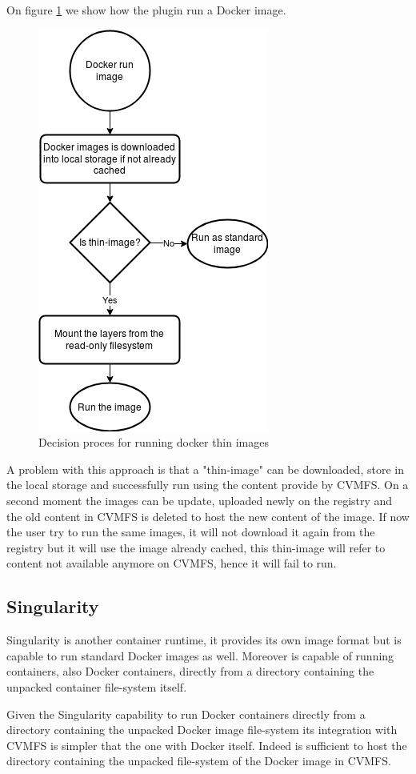 On figure \ref{fig:flowchart-run-thin-image} we show how the plugin run a Docker image. 

\begin{figure}
\includegraphics{gfx/RunThinImages}
\caption{Decision proces for running docker thin images}
\label{fig:flowchart-run-thin-image}
\end{figure}

A problem with this approach is that a "thin-image" can be downloaded, store in
the local storage and successfully run using the content provide by CVMFS. On a
second moment the images can be update, uploaded newly on the registry and the
old content in CVMFS is deleted to host the new content of the image. If now
the user try to run the same images, it will not download it again from the
registry but it will use the image already cached, this thin-image will refer
to content not available anymore on CVMFS, hence it will fail to run.

\subsection{Singularity}

Singularity is another container runtime, it provides its own image format but
is capable to run standard Docker images as well. Moreover is capable of
running containers, also Docker containers, directly from a directory
containing the unpacked container file-system itself. 

Given the Singularity capability to run Docker containers directly from a
directory containing the unpacked Docker image file-system its integration with
CVMFS is simpler that the one with Docker itself. Indeed is sufficient to host
the directory containing the unpacked file-system of the Docker image in CVMFS.



